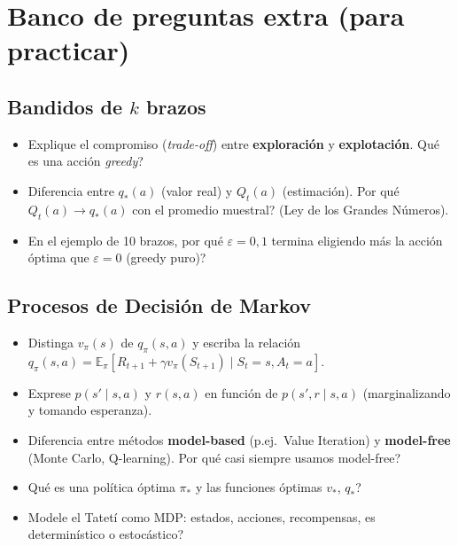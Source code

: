 \documentclass[11pt, a4paper]{article}
\begin{document}
\section{Banco de preguntas extra (para practicar)}

\subsection*{Bandidos de $k$ brazos}
\begin{itemize}[nosep]
    \item Explique el compromiso (\emph{trade-off}) entre \textbf{exploraci\'on} y \textbf{explotaci\'on}. \textquestiondown Qu\'e es una acci\'on \emph{greedy}?
    \item Diferencia entre $q_*(a)$ (valor real) y $Q_t(a)$ (estimaci\'on). \textquestiondown Por qu\'e $Q_t(a)\to q_*(a)$ con el promedio muestral? (Ley de los Grandes N\'umeros).
    \item En el ejemplo de 10 brazos, \textquestiondown por qu\'e $\varepsilon=0{,}1$ termina eligiendo m\'as la acci\'on \'optima que $\varepsilon=0$ (greedy puro)?
\end{itemize}

\subsection*{Procesos de Decisi\'on de Markov}
\begin{itemize}[nosep]
    \item Distinga $v_\pi(s)$ de $q_\pi(s,a)$ y escriba la relaci\'on $q_\pi(s,a)=\mathbb{E}_\pi[R_{t+1}+\gamma v_\pi(S_{t+1})\mid S_t{=}s, A_t{=}a]$.
    \item Exprese $p(s'\mid s,a)$ y $r(s,a)$ en funci\'on de $p(s',r\mid s,a)$ (marginalizando y tomando esperanza).
    \item Diferencia entre m\'etodos \textbf{model-based} (p.ej.\ Value Iteration) y \textbf{model-free} (Monte Carlo, Q-learning). \textquestiondown Por qu\'e casi siempre usamos model-free?
    \item \textquestiondown Qu\'e es una pol\'itica \'optima $\pi_*$ y las funciones \'optimas $v_*$, $q_*$?
    \item Modele el Tatet\'i como MDP: estados, acciones, recompensas, \textquestiondown es determin\'istico o estoc\'astico?
\end{itemize}
\end{document}
